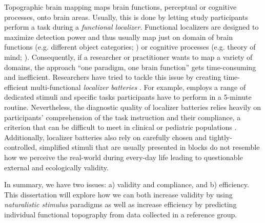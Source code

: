


Topographic brain mapping maps brain functions, perceptual or cognitive
processes, onto brain areas.
Usually, this is done by letting study participants perform a task during a
\textit{functional localizer}.
Functional localizers are designed to maximize detection power and thus usually
map just on domain of brain functions (e.g. different object categories;
\citet{kanwisher1997ffa}) or cognitive processes (e.g. theory of mind;
\citet{spunt2014validating}).
Consequently, if a researcher or practitioner wants to map a variety of domains,
the approach ``one paradigm, one brain function'' gets time-consuming and
inefficient.
Researchers have tried to tackle this issue by creating time-efficient
multi-functional \textit{localizer batteries} \citep{pinel2007fast,
pinho2018individual, pinho2020individual}.
For example, \citet{pinel2007fast} employs a range of dedicated stimuli and
specific tasks participants have to perform in a 5-minute routine.
Nevertheless, the diagnostic quality of localizer batteries relies heavily on
participants' comprehension of the task instruction and their compliance, a
criterion that can be difficult to meet in clinical or pediatric populations
\citep{eickhoff2020towards, vanderwal2015inscapes, vanderwal2019movies}.
Additionally, localizer batteries also rely on carefully chosen and
tightly-controlled, simplified stimuli that are usually presented in blocks do
not resemble how we perceive the real-world during every-day life leading to
questionable external and ecologically validity.

In summary, we have two issues: a) validity and compliance, and b) efficiency.
This dissertation will explore how we can both increase validity by using
\textit{naturalistic stimulus} paradigms as well as increase efficiency by
predicting individual functional topography from data collected in a reference
group.


